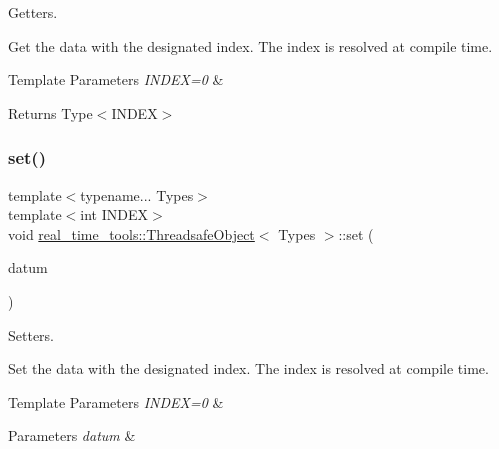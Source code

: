 Getters. 

Get the data with the designated index. The index is resolved at compile time.


\begin{DoxyTemplParams}{Template Parameters}
{\em I\+N\+D\+E\+X=0} & \\
\hline
\end{DoxyTemplParams}
\begin{DoxyReturn}{Returns}
Type$<$\+I\+N\+D\+E\+X$>$ 
\end{DoxyReturn}
\mbox{\label{classreal__time__tools_1_1ThreadsafeObject_af476dc729bd9c02387d5fcf15e513448}} 
\subsubsection{\texorpdfstring{set()}{set()}\hspace{0.1cm}{\footnotesize\ttfamily [1/2]}}
{\footnotesize\ttfamily template$<$typename... Types$>$ \\
template$<$int I\+N\+D\+EX$>$ \\
void \hyperlink{classreal__time__tools_1_1ThreadsafeObject}{real\+\_\+time\+\_\+tools\+::\+Threadsafe\+Object}$<$ Types $>$\+::set (\begin{DoxyParamCaption}\item[{\hyperlink{classreal__time__tools_1_1ThreadsafeObject}{Threadsafe\+Object}$<$ Types... $>$\+::\hyperlink{classreal__time__tools_1_1ThreadsafeObject_afcbd77df1964d4fe606f1e776f1ff9b8}{Type}$<$ I\+N\+D\+EX $>$}]{datum }\end{DoxyParamCaption})}



Setters. 

Set the data with the designated index. The index is resolved at compile time.


\begin{DoxyTemplParams}{Template Parameters}
{\em I\+N\+D\+E\+X=0} & \\
\hline
\end{DoxyTemplParams}

\begin{DoxyParams}{Parameters}
{\em datum} & \\
\hline
\end{DoxyParams}
\mbox{\label{classreal__time__tools_1_1ThreadsafeObject_a57fe7089b589f905a13127c50ceb2dae}} 
